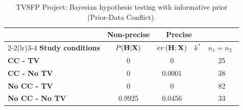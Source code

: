 \documentclass[AMA,Times1COL]{WileyNJDv5} %
\newcommand{\bX}{\boldsymbol{\mathrm{X}}}
\begin{document}
\begin{center}
\begin{table}[!h]%
\caption{TVSFP Project: Bayesian hypothesis testing with informative prior (Prior-Data Conflict).}\label{tab4}%
\begin{tabular*}{\textwidth}{@{\extracolsep\fill}lcccc@{}}
\toprule
&\multicolumn{1}{c}{\textbf{Non-precise}} & \multicolumn{2}{c}{\textbf{Precise}} \\\cmidrule(lr){2-2}\cmidrule(lr){3-4}
\textbf{Study conditions} & $P(\text{\textbf{H}}\vert \bX)$   & $ev\left(\text{\textbf{H}};\bX\right)$  & $k^*$& $n_1=n_2$\   \\
\midrule
\textbf{CC - TV} & 0 & 0& & 25  \\ 
 \textbf{CC - No TV} & 0& 0.0001& &38 \\ 
 \textbf{No CC - TV} & 0 & 0& &82 \\ 
  \textbf{No CC - No TV} & 0.9925& 0.0456& &33\\ 
\bottomrule
\end{tabular*}
\end{table}
\end{center}
\end{document}
